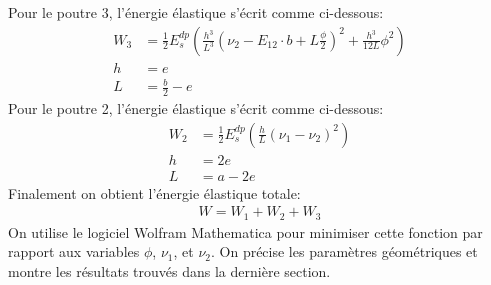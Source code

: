 \documentclass{article}
\begin{document}
Pour le poutre \large{\textcircled{\small{3}}}, l’énergie élastique s’écrit comme ci-dessous:\\
\begin{align*}
    W_{3}&=\frac{1}{2}E_{s}^{dp}(\frac{h^{3}}{L^{3}}(\nu_{2}-E_{12}\cdot b+L\frac{\phi}{2})^{2}+\frac{h^{3}}{12L}\phi^{2})\\
    h&=e\\
    L&=\frac{b}{2}-e
\end{align*}
Pour le poutre \large{\textcircled{\small{2}}}, l’énergie élastique s’écrit comme ci-dessous:\\
\begin{align*}
    W_{2}&=\frac{1}{2}E_{s}^{dp}(\frac{h}{L}(\nu_{1}-\nu_{2})^{2})\\
    h&=2e\\
    L&=a-2e
\end{align*}
Finalement on obtient l’énergie élastique totale:\\
\begin{align*}
    W=W_{1}+W_{2}+W_{3}
\end{align*}
On utilise le logiciel Wolfram Mathematica pour minimiser cette fonction par rapport aux variables $\phi$, $\nu_{1}$, et $\nu_{2}$. On précise les paramètres géométriques et montre les résultats trouvés dans la dernière section.
\end{document}
